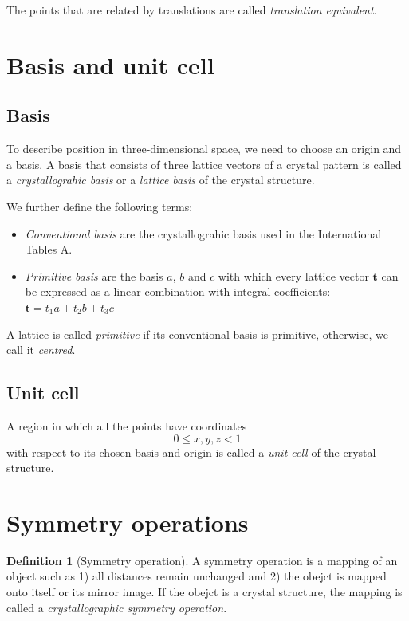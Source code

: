 \documentclass{amsart}
\newcommand{\bft}{\mathbf{t}}
\theoremstyle{remark}
\theoremstyle{remark}
\theoremstyle{definition}
\newtheorem*{definition}{Definition}
\begin{document}
The points that are related by translations are called \emph{translation equivalent}.

\vspace{10pt}
\section*{Basis and unit cell}

\subsection*{Basis}
To describe position in three-dimensional space, we need to choose an origin and a basis. 
A basis that consists of three lattice vectors of a crystal pattern is called a \emph{crystallograhic basis}
or a \emph{lattice basis} of the crystal structure. 

We further define the following terms:
\begin{itemize}
    \item \emph{Conventional basis} are the crystallograhic basis used in the International Tables A.
    \item \emph{Primitive basis} are the basis $a$, $b$ and $c$ with which every lattice vector $\bft$ can be expressed 
            as a linear combination with integral coefficients: $\bft = t_1 a + t_2 b + t_3 c$
\end{itemize}
A lattice is called \emph{primitive} if its conventional basis is primitive,  otherwise, we call it \emph{centred}. 

\subsection*{Unit cell}
A region in which all the points have coordinates \[0 \leq x,y,z < 1\]
with respect to its chosen basis and origin is called a \emph{unit cell} of the crystal structure.

\vspace{10pt}
\section*{Symmetry operations}

\begin{definition}
    [Symmetry operation]
    A symmetry operation is a mapping of an object such as 1) all distances remain unchanged and 2) the obejct is mapped onto itself or its mirror image.
    If the obejct is a crystal structure, the mapping is called a \emph{crystallographic symmetry operation}.
\end{definition}
\end{document}
